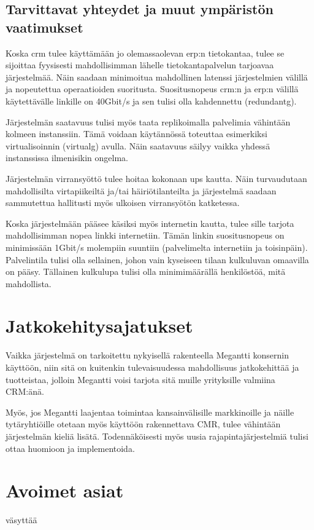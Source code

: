     \subsection{Tarvittavat yhteydet ja muut ympäristön vaatimukset}  %
        Koska \gls{crm} tulee käyttämään jo olemassaolevan \gls{erp}:n tietokantaa, tulee se sijoittaa fyysisesti mahdollisimman lähelle tietokantapalvelun
        tarjoavaa järjestelmää. Näin saadaan minimoitua mahdollinen latenssi järjestelmien välillä ja nopeutettua operaatioiden suoritusta. Suositusnopeus 
        \gls{crm}:n ja \gls{erp}:n välillä käytettävälle linkille on 40Gbit/s ja sen tulisi olla kahdennettu (\gls{redundantg}). 

        Järjestelmän saatavuus tulisi myös taata replikoimalla palvelimia vähintään kolmeen instanssiin. Tämä voidaan käytännössä toteuttaa esimerkiksi virtualisoinnin 
        (\gls{virtualg}) avulla. Näin saatavuus säilyy vaikka yhdessä instanssissa ilmenisikin ongelma. 
        
        Järjestelmän virransyöttö tulee hoitaa kokonaan \gls{ups} kautta. Näin turvaudutaan mahdollisilta virtapiikeiltä ja/tai häiriötilanteilta ja järjestelmä saadaan
        sammutettua hallitusti myös ulkoisen virransyötön katketessa. 
        
        Koska järjestelmään pääsee käsiksi myös internetin kautta, tulee sille tarjota mahdollisimman nopea linkki internetiin. Tämän linkin suositusnopeus on minimissään 
        1Gbit/s molempiin suuntiin (palvelimelta internetiin ja toisinpäin). 
        Palvelintila tulisi olla sellainen, johon vain kyseiseen tilaan kulkuluvan omaavilla on pääsy. Tällainen kulkulupa tulisi olla minimimäärällä henkilöstöä, mitä mahdollista. 

\section{Jatkokehitysajatukset}     %

    Vaikka järjestelmä on tarkoitettu nykyisellä rakenteella Megantti konsernin käyttöön, niin sitä on kuitenkin tulevaisuudessa
    mahdollisuus jatkokehittää ja tuotteistaa, jolloin Megantti voisi tarjota sitä muille yrityksille valmiina CRM:änä.

    Myös, jos Megantti laajentaa toimintaa kansainvälisille markkinoille ja näille tytäryhtiöille otetaan myös käyttöön rakennettava
    CMR, tulee vähintään järjestelmän kieliä lisätä. Todennäköisesti myös uusia rajapintajärjestelmiä tulisi ottaa huomioon ja implementoida.

\section{Avoimet asiat}     %

    väsyttää



   
